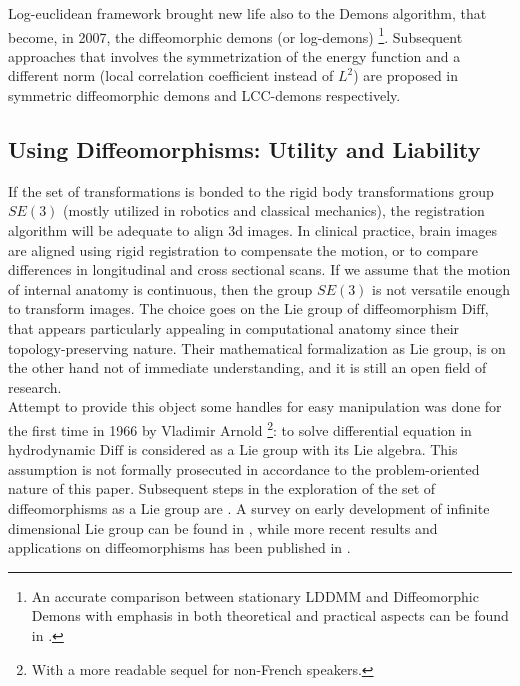 \begin{enumerate}
	Log-euclidean framework brought new life also to the Demons algorithm, that  become, in 2007, the diffeomorphic demons (or log-demons) \cite{vercauteren2007non}\footnote{An accurate comparison between stationary LDDMM and Diffeomorphic Demons with emphasis in both theoretical and practical aspects can be found in \cite{hernandez2008comparing}.}. Subsequent approaches that involves the symmetrization of the energy function and a different norm (local correlation coefficient instead of $L^{2}$) are proposed in symmetric diffeomorphic demons \cite{vercauteren08} and LCC-demons \cite{lorenzi2013lcc} respectively.
	
\end{enumerate}


\subsection{Using Diffeomorphisms: Utility and Liability}\label{se:diffe_util_and_liab}

If the set of transformations is bonded to the rigid body transformations group $SE(3)$ (mostly utilized in robotics and classical mechanics), the registration algorithm will be adequate to align 3d images. In clinical practice, brain images are aligned using rigid registration to compensate the motion, or to compare differences in longitudinal and cross sectional scans. If we assume that the motion of internal anatomy is continuous, then the group $SE(3)$ is not versatile enough to transform images. The choice goes on the Lie group of diffeomorphism $\text{Diff}$, that appears particularly appealing in computational anatomy since their topology-preserving nature. 
Their mathematical formalization as Lie group, is on the other hand not of immediate understanding, and it is still an open field of research.\\ 
Attempt to provide this object some handles for easy manipulation was done for the first time in 1966 by Vladimir Arnold \cite{arnold1966geometrie} \footnote{With a more readable sequel \cite{arnold1998topological} for non-French speakers.}: to solve differential equation in hydrodynamic  $\text{Diff}$ is considered as a Lie group with its Lie algebra. This assumption is not formally prosecuted in accordance to the problem-oriented nature of this paper. Subsequent steps in the exploration of the set of diffeomorphisms as a Lie group are \cite{marsden1970hamiltonian, ebin1970groups, omori1970group, leslie1983lie}. A survey on early development of infinite dimensional Lie group can be found in \cite{Milnor:84:remarks}, while more recent results and applications on diffeomorphisms has been published in \cite{ovsienko1992integrals, bauer2010sobolev,schmid2010infinite,  bauer2011geodesic}.\\

